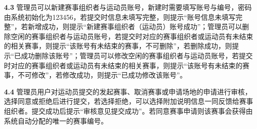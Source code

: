\documentclass[a4paper,UTF8]{article}
\begin{document}
\textbf{4.3} 管理员可以新建赛事组织者与运动员账号，新建时需要填写账号与编号，密码由系统初始化为123456，若提交时信息未填写完整，则提示“账号信息未填写完整”，若新增成功，则提示“新建赛事组织者（运动员）账号成功”；管理员可以删除空闲的赛事组织者与运动员账号，若提交时对应的赛事组织者或运动员有未结束的相关赛事，则提示“该账号有未结束的赛事，不可删除”，若删除成功，则提示“已成功删除该账号”；管理员可以修改空闲的赛事组织者与运动员账号，若提交时对应的赛事组织者或运动员有未结束的相关赛事，则提示“该账号有未结束的赛事，不可修改”，若修改成功，则提示“已成功修改该账号”。

\textbf{4.4}  管理员用户对运动员提交的发起赛事、取消赛事或申请场地的申请进行审核，选择同意或拒绝后进行提交，若选择拒绝，可以选择附加说明信息一同反馈给赛事组织者。提交成功后提示“审核意见提交成功”。若同意赛事申请则该赛事会获得由系统自动分配的唯一的赛事编号。
\end{document}
